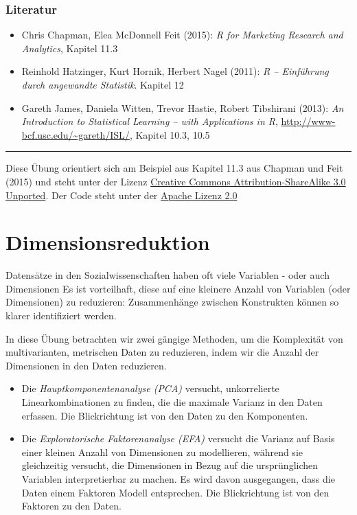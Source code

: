 \documentclass[12pt,]{book}
\providecommand{\tightlist}{%
  \setlength{\itemsep}{0pt}\setlength{\parskip}{0pt}}
\begin{document}
\subsection{Literatur}\label{literatur-3}

\begin{itemize}
\tightlist
\item
  Chris Chapman, Elea McDonnell Feit (2015): \emph{R for Marketing
  Research and Analytics}, Kapitel 11.3
\item
  Reinhold Hatzinger, Kurt Hornik, Herbert Nagel (2011): \emph{R --
  Einführung durch angewandte Statistik}. Kapitel 12
\item
  Gareth James, Daniela Witten, Trevor Hastie, Robert Tibshirani (2013):
  \emph{An Introduction to Statistical Learning -- with Applications in
  R}, \url{http://www-bcf.usc.edu/~gareth/ISL/}, Kapitel 10.3, 10.5
\end{itemize}

\begin{center}\rule{0.5\linewidth}{\linethickness}\end{center}

Diese Übung orientiert sich am Beispiel aus Kapitel 11.3 aus Chapman und
Feit (2015) und steht unter der Lizenz
\href{http://creativecommons.org/licenses/by-sa/3.0}{Creative Commons
Attribution-ShareAlike 3.0 Unported}. Der Code steht unter der
\href{http://www.apache.org/licenses/LICENSE-2.0}{Apache Lizenz 2.0}

\chapter{Dimensionsreduktion}\label{dimensionsreduktion}

Datensätze in den Sozialwissenschaften haben oft viele Variablen - oder
auch Dimensionen Es ist vorteilhaft, diese auf eine kleinere Anzahl von
Variablen (oder Dimensionen) zu reduzieren: Zusammenhänge zwischen
Konstrukten können so klarer identifiziert werden.

In diese Übung betrachten wir zwei gängige Methoden, um die Komplexität
von multivarianten, metrischen Daten zu reduzieren, indem wir die Anzahl
der Dimensionen in den Daten reduzieren.

\begin{itemize}
\item
  Die \emph{Hauptkomponentenanalyse (PCA)} versucht, unkorrelierte
  Linearkombinationen zu finden, die die maximale Varianz in den Daten
  erfassen. Die Blickrichtung ist von den Daten zu den Komponenten.
\item
  Die \emph{Exploratorische Faktorenanalyse (EFA)} versucht die Varianz
  auf Basis einer kleinen Anzahl von Dimensionen zu modellieren, während
  sie gleichzeitig versucht, die Dimensionen in Bezug auf die
  ursprünglichen Variablen interpretierbar zu machen. Es wird davon
  ausgegangen, dass die Daten einem Faktoren Modell entsprechen. Die
  Blickrichtung ist von den Faktoren zu den Daten.
\end{itemize}
\end{document}
